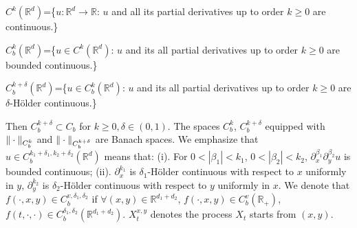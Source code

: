 \documentclass[11pt,reqno]{amsart}
\numberwithin{equation}{section}
\newcommand{\de}{\delta}
\begin{document}
$ C^{k}(\mathbb{R}^{d} )$=\{$u:\mathbb{R}^{d}\longrightarrow \mathbb{R}$: $u$ and all its partial derivatives up to order $k\geq0$ are continuous.\}

$ C^{k}_{b}(\mathbb{R}^{d} )$=\{$u\in  C^{k}(\mathbb{R}^{d})$: $u$ and its all partial derivatives up to order $k\geq0$ are bounded continuous.\}

$ C^{k+\delta}_{b}(\mathbb{R}^{d} )$=\{$u\in  C^{k}_{b}(\mathbb{R}^{d})$: $u$ and its all  partial derivatives up to order $k\geq0$ are $\delta$-H\"{o}lder continuous.\}

Then $ C_b^{k+\de}\subset C_b$ for $k\geq0, \de\in(0,1)$. The spaces $ C^{k}_{b}$, $C^{k+\delta}_{b}$  equipped with $\Arrowvert \cdot\Arrowvert_{C^{k}_{b}}$ and $\Arrowvert \cdot\Arrowvert_{C^{k+\delta}_{b}}$ are Banach spaces. We emphasize that $u\in C^{k_{1}+\delta_{1},k_{2}+\delta_{2}}_{b}(\mathbb{R}^{d} )$ means that: 
(i). For $0<|\beta_{1}|<k_{1}$,  $0<|\beta_{2}|<k_{2}$, $\partial_{x}^{\beta_{1}}\partial_{y}^{\beta_{2}}u$ is bounded continuous; (ii).  $\partial_{x}^{k_{1}}$ is $\delta_{1}$-H\"{o}lder continuous with respect to $x$ uniformly in $y$,   $\partial_{y}^{k_{2}}$ is $\delta_{2}$-H\"{o}lder continuous with respect to $y$ uniformly in $x$. We denote that $f(\cdot,x,y)\in C_{b}^{v,\delta_{1},\delta_{2}}$ if $\forall (x,y)\in \mathbb{R}^{d_{1}+d_{2}}$, $f(\cdot,x,y)\in C_{b}^{v}(\mathbb{R_{+}})$, $f(t,\cdot,\cdot)\in C_{b}^{\delta_{1},\delta_{2}}(\mathbb{R}^{d_{1}+d_{2}})$. $X^{x,y}_{t}$  denotes the process $X_{t}$ starts from $(x,y)$. 
\end{document}
